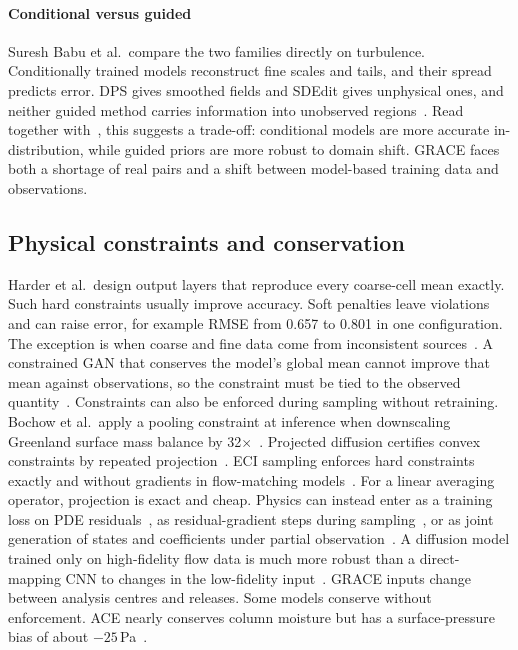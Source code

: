 \paragraph{Conditional versus guided} Suresh Babu et al.\ compare the two families directly on turbulence. Conditionally trained models reconstruct fine scales and tails, and their spread predicts error. DPS gives smoothed fields and SDEdit gives unphysical ones, and neither guided method carries information into unobserved regions~\cite{sureshbabu2025guided}. Read together with~\cite{tie2026zssd}, this suggests a trade-off: conditional models are more accurate in-distribution, while guided priors are more robust to domain shift. GRACE faces both a shortage of real pairs and a shift between model-based training data and observations.

\subsection{Physical constraints and conservation}

Harder et al.\ design output layers that reproduce every coarse-cell mean exactly. Such hard constraints usually improve accuracy. Soft penalties leave violations and can raise error, for example RMSE from 0.657 to 0.801 in one configuration. The exception is when coarse and fine data come from inconsistent sources~\cite{harder2023hard}. A constrained GAN that conserves the model's global mean cannot improve that mean against observations, so the constraint must be tied to the observed quantity~\cite{hess2022pcgan}. Constraints can also be enforced during sampling without retraining. Bochow et al.\ apply a pooling constraint at inference when downscaling Greenland surface mass balance by 32$\times$~\cite{bochow2026smb}. Projected diffusion certifies convex constraints by repeated projection~\cite{christopher2024projected}. ECI sampling enforces hard constraints exactly and without gradients in flow-matching models~\cite{cheng2025eci}. For a linear averaging operator, projection is exact and cheap. Physics can instead enter as a training loss on PDE residuals~\cite{bastek2025pidm}, as residual-gradient steps during sampling~\cite{jacobsen2023cocogen,shu2023pidiffusion}, or as joint generation of states and coefficients under partial observation~\cite{huang2024diffusionpde}. A diffusion model trained only on high-fidelity flow data is much more robust than a direct-mapping CNN to changes in the low-fidelity input~\cite{shu2023pidiffusion}. GRACE inputs change between analysis centres and releases. Some models conserve without enforcement. ACE nearly conserves column moisture but has a surface-pressure bias of about $-25$\,Pa~\cite{wattmeyer2023ace}.


